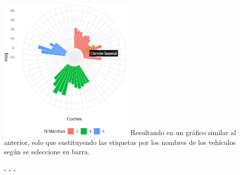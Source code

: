 \documentclass{article}\usepackage[]{graphicx}\usepackage[]{color}
\begin{document}
\vbox{
    \centering
    \includegraphics[width=0.5\textwidth]{imag/ggplot2_inte_cr}
}
Resultando en un gr\'afico similar al anterior, solo que sustituyendo las etiquetas por los nombres de los veh\'iculos seg\'un se seleccione su barra.
\begin{center}
\textbf{. . .}
\end{center}
\end{document}

